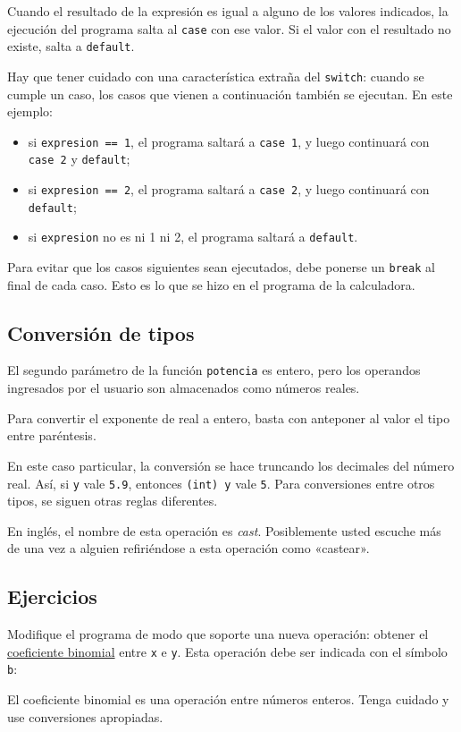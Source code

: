 Cuando el resultado de la expresión es igual a alguno de los valores
indicados, la ejecución del programa salta al \lstinline!case! con ese
valor. Si el valor con el resultado no existe, salta a
\lstinline!default!.

Hay que tener cuidado con una característica extraña del
\lstinline!switch!: cuando se cumple un caso, los casos que vienen a
continuación también se ejecutan. En este ejemplo:

\begin{itemize}
\item
  si \lstinline!expresion == 1!, el programa saltará a
  \lstinline!case 1!, y luego continuará con \lstinline!case 2! y
  \lstinline!default!;
\item
  si \lstinline!expresion == 2!, el programa saltará a
  \lstinline!case 2!, y luego continuará con \lstinline!default!;
\item
  si \lstinline!expresion! no es ni 1 ni 2, el programa saltará a
  \lstinline!default!.
\end{itemize}

Para evitar que los casos siguientes sean ejecutados, debe ponerse un
\lstinline!break! al final de cada caso. Esto es lo que se hizo en el
programa de la calculadora.

\subsection{Conversión de tipos}

El segundo parámetro de la función \lstinline!potencia! es entero, pero
los operandos ingresados por el usuario son almacenados como números
reales.

Para convertir el exponente de real a entero, basta con anteponer al
valor el tipo entre paréntesis.

En este caso particular, la conversión se hace truncando los decimales
del número real. Así, si \lstinline!y! vale \lstinline!5.9!, entonces
\lstinline!(int) y! vale \lstinline!5!. Para conversiones entre otros
tipos, se siguen otras reglas diferentes.

En inglés, el nombre de esta operación es \emph{cast}. Posiblemente
usted escuche más de una vez a alguien refiriéndose a esta operación
como «castear».

\subsection{Ejercicios}

Modifique el programa de modo que soporte una nueva operación: obtener
el \href{http://es.wikipedia.org/wiki/Coeficiente\_binomial}{coeficiente
binomial} entre \lstinline!x! e \lstinline!y!. Esta operación debe ser
indicada con el símbolo \lstinline!b!:

El coeficiente binomial es una operación entre números enteros. Tenga
cuidado y use conversiones apropiadas.
